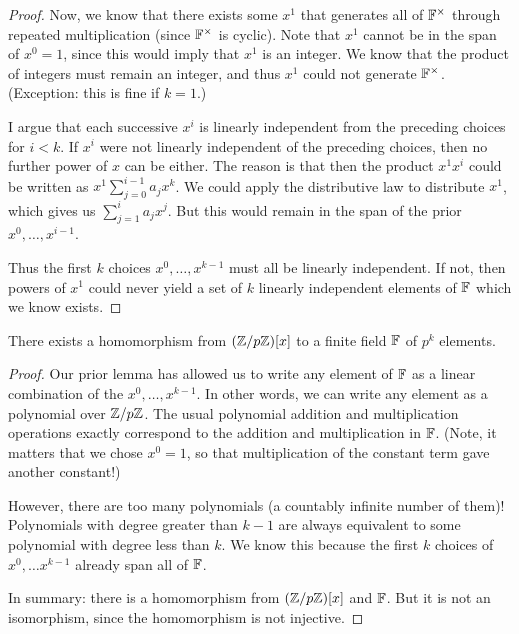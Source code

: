 \begin{proof}
  Now, we know that there exists some $x^1$ that generates all of
  $\mathbb{F}^\times$ through repeated multiplication (since $\mathbb{F}^\times$ is
  cyclic). Note that $x^1$ cannot be in the span of $x^0 = 1$, since
  this would imply that $x^1$ is an integer. We know that the product of
  integers must remain an integer, and thus $x^1$ could not generate
  $\mathbb{F}^\times$. (Exception: this is fine if $k = 1$.)

  I argue that each successive $x^i$ is linearly independent from the
  preceding choices for $i < k$. If $x^i$ were not linearly independent
  of the preceding choices, then no further power of $x$ can be either.
  The reason is that then the product $x^1 x^i$ could be written as $x^1
  \sum_{j = 0}^{i - 1} a_j x^k$. We could apply the distributive law to
  distribute $x^1$, which gives us $\sum_{j=1}^{i} a_j x^j$. But this
  would remain in the span of the prior $x^0, \ldots, x^{i - 1}$.

  Thus the first $k$ choices $x^0, \ldots, x^{k - 1}$ must all be
  linearly independent. If not, then powers of $x^1$ could never yield a
  set of $k$ linearly independent elements of $\mathbb{F}$ which we know exists.
\end{proof}

\begin{lemma}
  There exists a homomorphism from $\mathopen{}\left( {\mathbb{Z} / p\mathbb{Z}} \right)\mathclose{}[x]$ to a finite
  field $\mathbb{F}$ of $p^k$ elements.
\end{lemma}

\begin{proof}
  Our prior lemma has allowed us to write any element of $\mathbb{F}$ as a
  linear combination of the $x^0, \ldots, x^{k-1}$. In other words, we
  can write any element as a polynomial over $\mathbb{Z} / p\mathbb{Z}$. The usual
  polynomial addition and multiplication operations exactly correspond
  to the addition and multiplication in $\mathbb{F}$. (Note, it matters that we
  chose $x^0 = 1$, so that multiplication of the constant term gave
  another constant!)

  However, there are too many polynomials (a countably infinite number
  of them)! Polynomials with degree greater than $k-1$ are always
  equivalent to some polynomial with degree less than $k$. We know this
  because the first $k$ choices of $x^0, \ldots x^{k-1}$ already span
  all of $\mathbb{F}$.

  In summary: there is a homomorphism from $\mathopen{}\left( {\mathbb{Z} / p\mathbb{Z}} \right)\mathclose{}[x]$ and
  $\mathbb{F}$. But it is not an isomorphism, since the homomorphism is not
  injective.
\end{proof}

